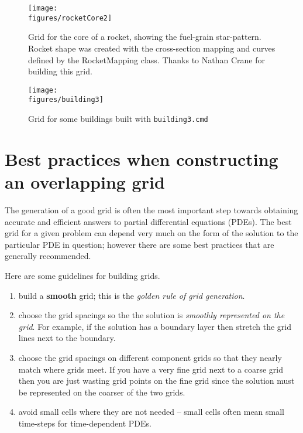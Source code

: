 \documentclass[xcolor=rgb,svgnames,dvipsnames]{article}
\newcommand{\figures}{../fig}
\begin{document}
\begin{figure}[hbt]
\begin{center}
   \texttt{[image: \\figures/rocketCore2]}
  \caption{Grid for the core of a rocket, showing the fuel-grain star-pattern. Rocket shape was created
      with the cross-section mapping and curves defined by the RocketMapping class. Thanks to Nathan Crane
      for building this grid.}
\end{center}
\end{figure}

\begin{figure}[hbt]
\begin{center}
   \texttt{[image: \\figures/building3]}
  \caption{Grid for some buildings built with {\tt building3.cmd}}
\end{center}
\end{figure}


\clearpage
\section{Best practices when constructing an overlapping grid}


The generation of a good grid is often the most important step towards obtaining
accurate and efficient answers to partial differential equations (PDEs). The
best grid for a given problem can depend very much on the form of the solution
to the particular PDE in question; however there are some best practices that
are generally recommended.

\noindent Here are some guidelines for building grids.
\begin{enumerate}
  \item build a {\bf smooth} grid; this is the {\em golden rule of grid generation}.
  \item choose the grid spacings so the the solution is {\em smoothly
      represented on the grid}. For example, if the solution has a boundary
      layer then stretch the grid lines next to the boundary. 
  \item choose the grid spacings on different component grids so that they
     nearly match where grids meet. If you have a very fine grid next to a
     coarse grid then you are just wasting grid points on the fine grid since
     the solution must be represented on the coarser of the two grids.
  \item avoid small cells where they are not needed -- small cells often mean
  small time-steps for time-dependent PDEs.
\end{enumerate}
\end{document}
